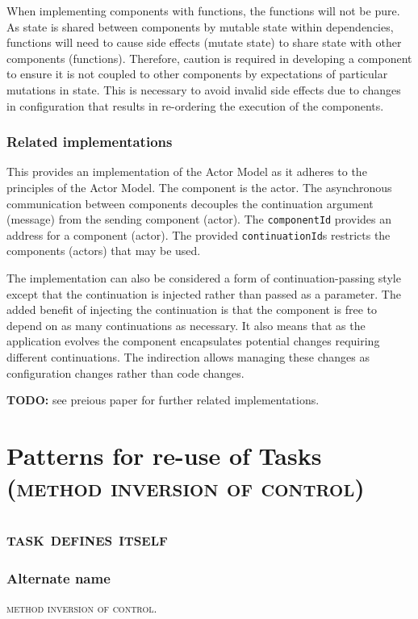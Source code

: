 \documentclass[prodmode]{style/acmlarge}
\begin{document}
When implementing components with functions, the functions will not be pure.  As
state is shared between components by mutable state within dependencies,
functions will need to cause side effects (mutate state) to share state with
other components (functions).  Therefore, caution is required in developing a
component to ensure it is not coupled to other components by expectations of
particular mutations in state.  This is necessary to avoid invalid side effects
due to changes in configuration that results in re-ordering the execution of the
components.


\subsubsection*{Related implementations}

This provides an implementation of the Actor Model \cite{actors} as it adheres
to the principles of the Actor Model.  The component is the actor.  The
asynchronous communication between components decouples the continuation
argument (message) from the sending component (actor).  The \texttt{componentId}
provides an address for a component (actor).  The provided
\texttt{continuationId}s restricts the components (actors) that may be used.

The implementation can also be considered a form of continuation-passing style
\cite{continuations} except that the continuation is injected rather than passed
as a parameter.  The added benefit of injecting the continuation is that the
component is free to depend on as many continuations as necessary.  It also
means that as the application evolves the component encapsulates potential
changes requiring different continuations.  The indirection allows managing
these changes as configuration changes rather than code changes.

\textbf{TODO:} see preious paper for further related implementations.



\section{Patterns for re-use of Tasks (\textsc{method inversion of control})}


\subsection{\textsc{\textbf{task defines itself}}}

\subsubsection*{Alternate name} \textsc{method inversion of control}.
\end{document}
